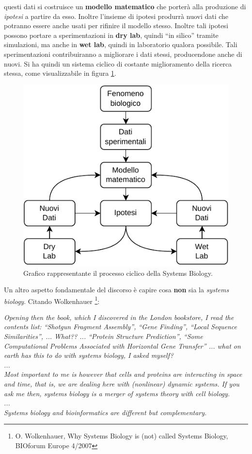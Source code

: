 \documentclass[a4paper,12pt, oneside]{book}
\begin{document}
questi dati si costruisce un \textbf{modello matematico} che porterà alla
produzione 
di \textit{ipotesi} a partire da esso. Inoltre l'insieme di ipotesi produrrà
nuovi dati che potranno essere anche usati per rifinire il modello
stesso. Inoltre tali ipotesi possono portare a sperimentazioni in \textbf{dry
  lab}, quindi ``in silico'' tramite simulazioni, ma anche in \textbf{wet lab},
quindi in laboratorio qualora possibile. Tali sperimentazioni contribuiranno a
migliorare i dati stessi, producendone anche di nuovi. Si ha quindi un sistema
ciclico di costante miglioramento della ricerca stessa, come visualizzabile in
figura \ref{fig:csb}.\\
\begin{figure}
  \centering
  \includegraphics[scale = 0.8]{img/csb.pdf}
  \caption{Grafico rappresentante il processo ciclico della Systems Biology.} 
  \label{fig:csb}
\end{figure}
Un altro aspetto fondamentale del discorso è capire cosa \textbf{non} sia la
\textit{systems biology}. Citando Wolkenhauer \footnote{O. Wolkenhauer, Why
  Systems Biology is (not) called Systems Biology, BIOforum Europe 4/2007}:
\begin{center}
  \textit{Opening then the book, which I discovered in the London bookstore, I
    read the contents list: “Shotgun Fragment Assembly”, “Gene Finding”, “Local
    Sequence Similarities”, ... What?? ... “Protein Structure Prediction”, “Some 
    Computational Problems Associated with Horizontal Gene Transfer” ... what on
    earth has this to do with systems biology, I asked myself?}\\
  \textit{...}\\
  \textit{Most important to me is
    however that cells and proteins are interacting in space and time, that
    is, we are dealing here with (nonlinear) dynamic systems. If you ask me
    then, systems biology is a merger of systems theory with cell biology.}
  \\
  \textit{...}\\
  \textit{Systems biology and bioinformatics are different but complementary.}
\end{center}
\end{document}
